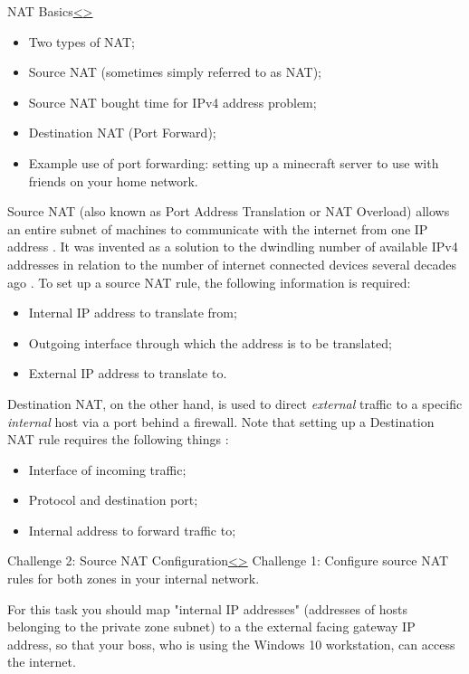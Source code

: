 \documentclass[12pt]{article}
\newenvironment{instructionblock}{\Large\bgroup}{\egroup}
\begin{document}
\pagebreak
\begin{slide}{NAT Basics}{\hyperref[slide 17]{\textless}\hyperref[slide 19]{\textgreater}}
\begin{instructionblock}
\begin{itemize}
\item Two types of NAT;
\item Source NAT (sometimes simply referred to as NAT);
\item Source NAT bought time for IPv4 address problem;
\item Destination NAT (Port Forward);
\item Example use of port forwarding: setting up a minecraft server to use with friends on your home network.
\end{itemize}
\end{instructionblock}
\end{slide}
\par Source NAT (also known as Port Address Translation or NAT Overload) allows an entire subnet of machines to communicate with the internet from one IP address \cite{vyoswiki}. It was invented as a solution to the dwindling number of available IPv4 addresses in relation to the number of internet connected devices several decades ago \cite{arsipv4}. To set up a source NAT rule, the following information is required:
\begin{itemize}
\item Internal IP address to translate from;
\item Outgoing interface through which the address is to be translated;
\item External IP address to translate to.
\end{itemize}


\par Destination NAT, on the other hand, is used to direct \emph{external} traffic to a specific \emph{internal} host via a port behind a firewall.
Note that setting up a Destination NAT rule requires the following things \cite{vyoswiki}:
\begin{itemize}
\item Interface of incoming traffic;
\item Protocol and destination port;
\item Internal address to forward traffic to;
\end{itemize}



\pagebreak
\begin{slide}{Challenge 2: Source NAT Configuration}{\hyperref[slide 18]{\textless}\hyperref[slide 20]{\textgreater}}
\begin{instructionblock}
Challenge 1: Configure source NAT rules for both zones in your internal network.
\end{instructionblock}
\end{slide}
\par For this task you should map "internal IP addresses" (addresses of hosts belonging to the private zone subnet) to a the external facing gateway IP address, so that your boss, who is using the Windows 10 workstation, can access the internet. 
\end{document}
